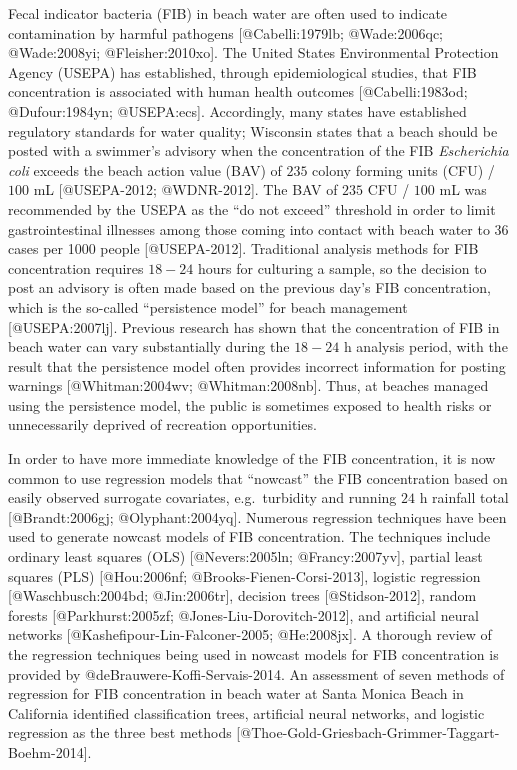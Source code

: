 Fecal indicator bacteria (FIB) in beach water are often used to indicate
contamination by harmful pathogens {[}@Cabelli:1979lb; @Wade:2006qc;
@Wade:2008yi; @Fleisher:2010xo{]}. The United States Environmental
Protection Agency (USEPA) has established, through epidemiological
studies, that FIB concentration is associated with human health outcomes
{[}@Cabelli:1983od; @Dufour:1984yn; @USEPA:ecs{]}. Accordingly, many
states have established regulatory standards for water quality;
Wisconsin states that a beach should be posted with a swimmer's advisory
when the concentration of the FIB \emph{Escherichia coli} exceeds the
beach action value (BAV) of \(235\) colony forming units (CFU) / \(100\)
mL {[}@USEPA-2012; @WDNR-2012{]}. The BAV of \(235\) CFU / \(100\) mL
was recommended by the USEPA as the ``do not exceed'' threshold in order
to limit gastrointestinal illnesses among those coming into contact with
beach water to 36 cases per 1000 people {[}@USEPA-2012{]}. Traditional
analysis methods for FIB concentration requires \(18-24\) hours for
culturing a sample, so the decision to post an advisory is often made
based on the previous day's FIB concentration, which is the so-called
``persistence model'' for beach management {[}@USEPA:2007lj{]}. Previous
research has shown that the concentration of FIB in beach water can vary
substantially during the \(18-24\) h analysis period, with the result
that the persistence model often provides incorrect information for
posting warnings {[}@Whitman:2004wv; @Whitman:2008nb{]}. Thus, at
beaches managed using the persistence model, the public is sometimes
exposed to health risks or unnecessarily deprived of recreation
opportunities.

In order to have more immediate knowledge of the FIB concentration, it
is now common to use regression models that ``nowcast'' the FIB
concentration based on easily observed surrogate covariates,
e.g.~turbidity and running \(24\) h rainfall total {[}@Brandt:2006gj;
@Olyphant:2004yq{]}. Numerous regression techniques have been used to
generate nowcast models of FIB concentration. The techniques include
ordinary least squares (OLS) {[}@Nevers:2005ln; @Francy:2007yv{]},
partial least squares (PLS) {[}@Hou:2006nf;
@Brooks-Fienen-Corsi-2013{]}, logistic regression {[}@Waschbusch:2004bd;
@Jin:2006tr{]}, decision trees {[}@Stidson-2012{]}, random forests
{[}@Parkhurst:2005zf; @Jones-Liu-Dorovitch-2012{]}, and artificial
neural networks {[}@Kashefipour-Lin-Falconer-2005; @He:2008jx{]}. A
thorough review of the regression techniques being used in nowcast
models for FIB concentration is provided by
@deBrauwere-Koffi-Servais-2014. An assessment of seven methods of
regression for FIB concentration in beach water at Santa Monica Beach in
California identified classification trees, artificial neural networks,
and logistic regression as the three best methods
{[}@Thoe-Gold-Griesbach-Grimmer-Taggart-Boehm-2014{]}.

